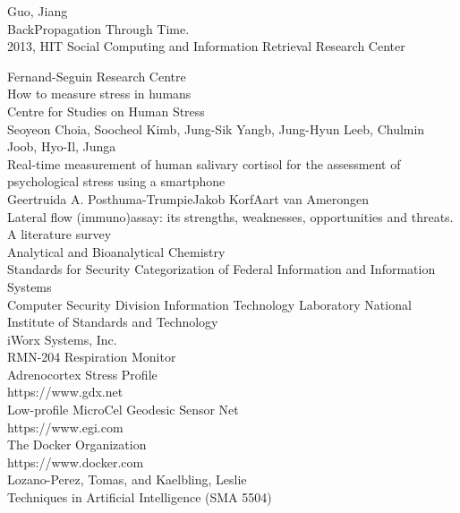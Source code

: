 \documentclass[10pt, titlepage, twocolumn]{article}
\begin{document}
\begin{thebibliography}{9}

 Guo, Jiang \\
BackPropagation Through Time.  \\
2013, HIT Social Computing and Information Retrieval Research Center 

 Fernand-Seguin Research Centre \\
How to measure stress in humans \\
Centre for Studies on Human Stress \\ 

 Seoyeon Choia, Soocheol Kimb, Jung-Sik Yangb, Jung-Hyun Leeb, Chulmin Joob, Hyo-Il, Junga \\
Real-time measurement of human salivary cortisol for the assessment of psychological stress using a smartphone \\

 Geertruida A. Posthuma-TrumpieJakob KorfAart van Amerongen \\
Lateral flow (immuno)assay: its strengths, weaknesses, opportunities and threats. A literature survey \\ 
Analytical and Bioanalytical Chemistry \\

Standards for Security Categorization of Federal Information and Information Systems\\
Computer Security Division Information Technology Laboratory National Institute of Standards and Technology \\

 iWorx Systems, Inc. \\
RMN-204 Respiration Monitor \\

Adrenocortex Stress Profile \\
https://www.gdx.net \\

 Low-profile MicroCel Geodesic Sensor Net\\
https://www.egi.com \\

The Docker Organization \\
https://www.docker.com \\

 Lozano-Perez, Tomas, and Kaelbling, Leslie \\
Techniques in Artificial Intelligence (SMA 5504)


\end{thebibliography}
\end{document}
